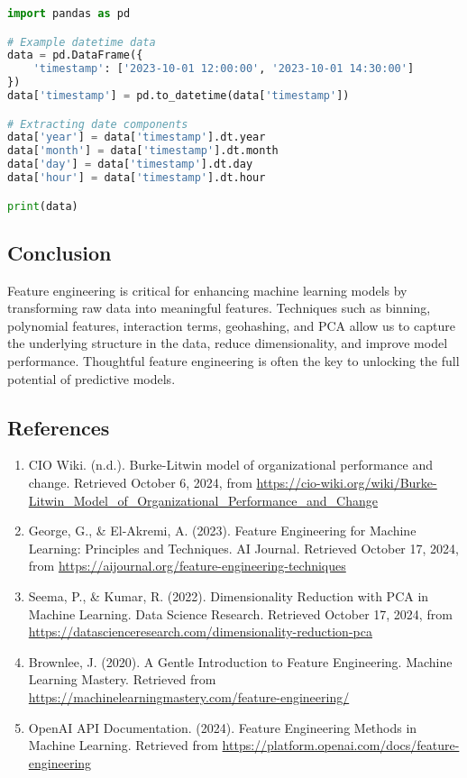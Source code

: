 \documentclass{article}
\begin{document}
\begin{lstlisting}[language=Python]
import pandas as pd

# Example datetime data
data = pd.DataFrame({
    'timestamp': ['2023-10-01 12:00:00', '2023-10-01 14:30:00']
})
data['timestamp'] = pd.to_datetime(data['timestamp'])

# Extracting date components
data['year'] = data['timestamp'].dt.year
data['month'] = data['timestamp'].dt.month
data['day'] = data['timestamp'].dt.day
data['hour'] = data['timestamp'].dt.hour

print(data)
\end{lstlisting}

\subsection*{Conclusion}
Feature engineering is critical for enhancing machine learning models by transforming raw data into meaningful features. Techniques such as binning, polynomial features, interaction terms, geohashing, and PCA allow us to capture the underlying structure in the data, reduce dimensionality, and improve model performance. Thoughtful feature engineering is often the key to unlocking the full potential of predictive models.

\subsection*{References}
\begin{enumerate}
    \item CIO Wiki. (n.d.). Burke-Litwin model of organizational performance and change. Retrieved October 6, 2024, from \url{https://cio-wiki.org/wiki/Burke-Litwin_Model_of_Organizational_Performance_and_Change}
    \item George, G., \& El-Akremi, A. (2023). Feature Engineering for Machine Learning: Principles and Techniques. AI Journal. Retrieved October 17, 2024, from \url{https://aijournal.org/feature-engineering-techniques}
    \item Seema, P., \& Kumar, R. (2022). Dimensionality Reduction with PCA in Machine Learning. Data Science Research. Retrieved October 17, 2024, from \url{https://datascienceresearch.com/dimensionality-reduction-pca}
    \item Brownlee, J. (2020). A Gentle Introduction to Feature Engineering. Machine Learning Mastery. Retrieved from \url{https://machinelearningmastery.com/feature-engineering/}
    \item OpenAI API Documentation. (2024). Feature Engineering Methods in Machine Learning. Retrieved from \url{https://platform.openai.com/docs/feature-engineering}
\end{enumerate}
\end{document}
